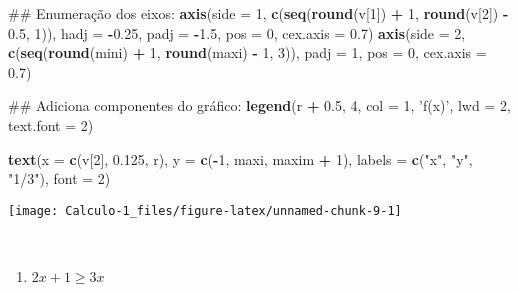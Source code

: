 \documentclass[]{book}
\newenvironment{Shaded}{\begin{snugshade}}{\end{snugshade}}
\newcommand{\KeywordTok}[1]{\textcolor[rgb]{0.13,0.29,0.53}{\textbf{#1}}}
\newcommand{\DataTypeTok}[1]{\textcolor[rgb]{0.13,0.29,0.53}{#1}}
\newcommand{\DecValTok}[1]{\textcolor[rgb]{0.00,0.00,0.81}{#1}}
\newcommand{\FloatTok}[1]{\textcolor[rgb]{0.00,0.00,0.81}{#1}}
\newcommand{\StringTok}[1]{\textcolor[rgb]{0.31,0.60,0.02}{#1}}
\newcommand{\OperatorTok}[1]{\textcolor[rgb]{0.81,0.36,0.00}{\textbf{#1}}}
\newcommand{\NormalTok}[1]{#1}
\providecommand{\tightlist}{%
  \setlength{\itemsep}{0pt}\setlength{\parskip}{0pt}}
\begin{document}
\begin{enumerate}
\begin{Shaded}
\begin{Highlighting}[]
\NormalTok{##  Enumeração dos eixos:}
\KeywordTok{axis}\NormalTok{(}\DataTypeTok{side =} \DecValTok{1}\NormalTok{, }\KeywordTok{c}\NormalTok{(}\KeywordTok{seq}\NormalTok{(}\KeywordTok{round}\NormalTok{(v[}\DecValTok{1}\NormalTok{]) }\OperatorTok{+}\StringTok{ }\DecValTok{1}\NormalTok{, }\KeywordTok{round}\NormalTok{(v[}\DecValTok{2}\NormalTok{]) }\OperatorTok{-}\StringTok{ }\FloatTok{0.5}\NormalTok{, }\DecValTok{1}\NormalTok{)),}
 \DataTypeTok{hadj =} \OperatorTok{-}\FloatTok{0.25}\NormalTok{, }\DataTypeTok{padj =} \OperatorTok{-}\FloatTok{1.5}\NormalTok{, }\DataTypeTok{pos =} \DecValTok{0}\NormalTok{, }\DataTypeTok{cex.axis =} \FloatTok{0.7}\NormalTok{)}
\KeywordTok{axis}\NormalTok{(}\DataTypeTok{side =} \DecValTok{2}\NormalTok{, }\KeywordTok{c}\NormalTok{(}\KeywordTok{seq}\NormalTok{(}\KeywordTok{round}\NormalTok{(mini) }\OperatorTok{+}\StringTok{ }\DecValTok{1}\NormalTok{, }\KeywordTok{round}\NormalTok{(maxi) }\OperatorTok{-}\StringTok{ }\DecValTok{1}\NormalTok{, }\DecValTok{3}\NormalTok{)),}
 \DataTypeTok{padj =} \DecValTok{1}\NormalTok{, }\DataTypeTok{pos =} \DecValTok{0}\NormalTok{, }\DataTypeTok{cex.axis =} \FloatTok{0.7}\NormalTok{)}

\NormalTok{##  Adiciona componentes do gráfico:}
\KeywordTok{legend}\NormalTok{(r }\OperatorTok{+}\StringTok{ }\FloatTok{0.5}\NormalTok{, }\DecValTok{4}\NormalTok{, }\DataTypeTok{col =} \DecValTok{1}\NormalTok{, }\StringTok{'f(x)'}\NormalTok{, }\DataTypeTok{lwd =} \DecValTok{2}\NormalTok{, }\DataTypeTok{text.font =} \DecValTok{2}\NormalTok{)}

\KeywordTok{text}\NormalTok{(}\DataTypeTok{x =} \KeywordTok{c}\NormalTok{(v[}\DecValTok{2}\NormalTok{], }\FloatTok{0.125}\NormalTok{, r), }\DataTypeTok{y =} \KeywordTok{c}\NormalTok{(}\OperatorTok{-}\DecValTok{1}\NormalTok{, maxi, maxim }\OperatorTok{+}\StringTok{ }\DecValTok{1}\NormalTok{),}
 \DataTypeTok{labels =} \KeywordTok{c}\NormalTok{(}\StringTok{"x"}\NormalTok{, }\StringTok{"y"}\NormalTok{, }\StringTok{"1/3"}\NormalTok{), }\DataTypeTok{font =} \DecValTok{2}\NormalTok{)  }
\end{Highlighting}
\end{Shaded}

  \begin{center}\texttt{[image: Calculo-1\_files/figure-latex/unnamed-chunk-9-1]} \end{center}

  ~

  \begin{enumerate}
  \def\labelenumii{\alph{enumii})}
  \setcounter{enumii}{5}
  \tightlist
  \item
    \(2x+1 \geqslant 3x\)
  \end{enumerate}


\end{enumerate}
\end{document}

